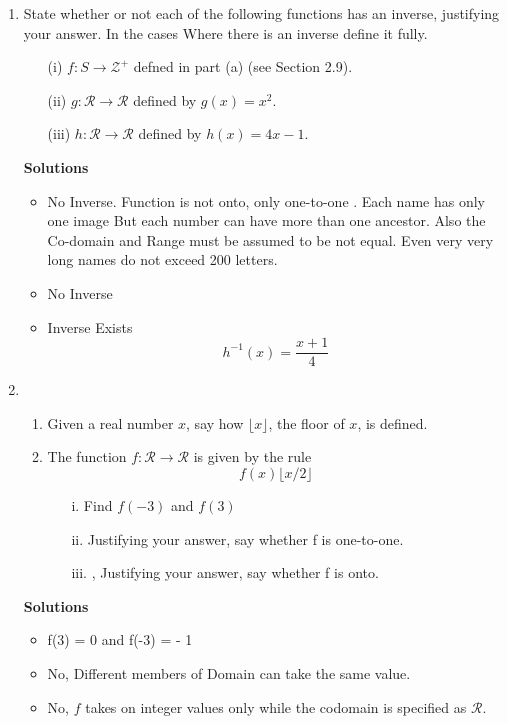 \documentclass[]{article}
\begin{document}
\begin{enumerate}
\item 
State whether or not each of the following functions has an inverse, justifying your answer. In the cases Where there is an inverse define it fully.

\begin{itemize}
\item[(i)] $f : S \rightarrow \mathcal{Z}^{+} $ defned in part (a) (see Section 2.9).
\item[(ii)] $g : \mathcal{R} \rightarrow  \mathcal{R} $ defined by $g(x) = x^2$.
\item[(iii)] $h : \mathcal{R} \rightarrow  \mathcal{R} $ defined by $h(x) = 4x - 1. $
\end{itemize}
\begin{framed}
\textbf{Solutions}
\begin{itemize}
\item No Inverse. Function is not onto, only one-to-one . Each name has only one image But each number can have more than one ancestor. Also the Co-domain and Range must be assumed to be not equal. Even very very long names do not exceed 200 letters.
\item No Inverse
\item Inverse Exists 
\[h^{-1}(x) = \frac{x+1}{4}  \]
\end{itemize}
\end{framed}


\item 
\begin{enumerate}
\item  Given a real number $x$, say how $\lfloor x \rfloor$, the floor of $x$, is defined.

\item  The function $f : \mathcal{R} \rightarrow \mathcal{R}$ is given by the rule
\[f(x) \lfloor x/2 \rfloor\]

\begin{itemize}
\item[ i.] Find $f(-3)$ and $f(3)$ 
\item[ii.] Justifying your answer, say whether f is one-to-one.
\item[iii.], Justifying your answer, say whether f is onto.
\end{itemize}
\end{enumerate}


\begin{framed}
\textbf{Solutions}
\begin{itemize}
\item f(3) = 0 and f(-3) = - 1
\item No, Different members of Domain can take the same value.
\item No, $f$ takes on integer values only while the codomain
is specified as $\mathcal{R}$.
\end{itemize}


\end{framed}
\end{enumerate}
\end{document}
